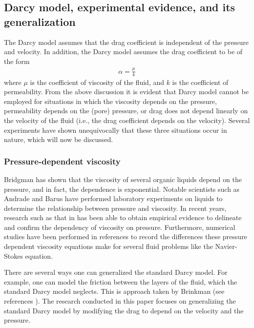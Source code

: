 \documentclass[11pt,reqno]{amsart}
\begin{document}
\subsection{Darcy model, experimental evidence, and its generalization}
The Darcy model assumes that the drag coefficient is 
independent of the pressure and velocity. In addition, 
the Darcy model assumes the drag coefficient to be of 
the form
\begin{align}
  \alpha = \frac{\mu}{k}
\end{align}
where $\mu$ is the coefficient of viscosity of the fluid, 
and $k$ is the coefficient of permeability. From the above 
discussion it is evident that Darcy model cannot be employed 
for situations in which the viscosity depends on the pressure, 
permeability depends on the (pore) pressure, or drag does not 
depend linearly on the velocity of the fluid (i.e., the drag 
coefficient depends on the velocity). Several experiments 
have shown unequivocally that these three situations occur 
in nature, which will now be discussed. 

\subsubsection{Pressure-dependent viscosity}
Bridgman \cite{Bridgman} has shown that the 
viscosity of several organic liquids depend on the 
pressure, and in fact, the dependence is exponential. 
Notable scientists such as Andrade \cite{Andrade} 
and Barus \cite{CarlBarus} have performed laboratory 
experiments on liquids to determine the relationship 
between pressure and viscosity. In recent years, 
research such as that in \cite{vanLeeuwen} has 
been able to obtain empirical evidence to delineate 
and confirm the dependency of viscosity on pressure. 
Furthermore, numerical studies have been performed 
in references \cite{M_Franta_Rajagopal,A_Him_FE_approximate} 
to record the differences these pressure dependent viscosity 
equations make for several fluid problems like the 
Navier-Stokes equation.

There are several ways one can generalized the standard 
Darcy model. For example, one can model the friction 
between the layers of the fluid, which the standard 
Darcy model neglects. This is approach taken by 
Brinkman (see references \cite{Brinkman_ASR_1947_vA1_p27,
Shriram_Nakshatrala}). The research conducted in this paper 
focuses on generalizing the standard Darcy model by modifying 
the drag to depend on the velocity and the pressure.  
\end{document}
